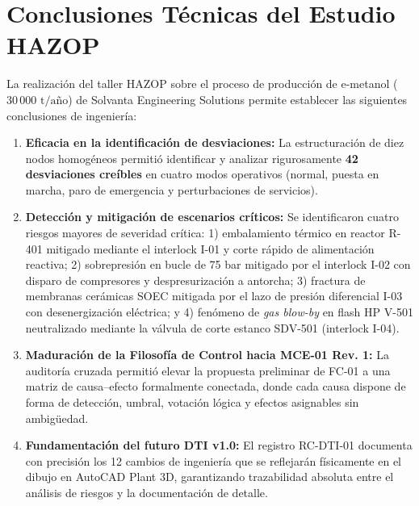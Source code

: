 \documentclass[10pt,letterpaper]{article}
\begin{document}
\section{Conclusiones Técnicas del Estudio HAZOP}
La realización del taller HAZOP sobre el proceso de producción de e-metanol ($30\,000\text{ t/año}$) de Solvanta Engineering Solutions permite establecer las siguientes conclusiones de ingeniería:
\begin{enumerate}[leftmargin=*]
    \item \textbf{Eficacia en la identificación de desviaciones:} La estructuración de diez nodos homogéneos permitió identificar y analizar rigurosamente \textbf{42 desviaciones creíbles} en cuatro modos operativos (normal, puesta en marcha, paro de emergencia y perturbaciones de servicios).
    \item \textbf{Detección y mitigación de escenarios críticos:} Se identificaron cuatro riesgos mayores de severidad crítica: 1) embalamiento térmico en reactor R-401 mitigado mediante el interlock I-01 y corte rápido de alimentación reactiva; 2) sobrepresión en bucle de 75 bar mitigado por el interlock I-02 con disparo de compresores y despresurización a antorcha; 3) fractura de membranas cerámicas SOEC mitigada por el lazo de presión diferencial I-03 con desenergización eléctrica; y 4) fenómeno de \textit{gas blow-by} en flash HP V-501 neutralizado mediante la válvula de corte estanco SDV-501 (interlock I-04).
    \item \textbf{Maduración de la Filosofía de Control hacia MCE-01 Rev. 1:} La auditoría cruzada permitió elevar la propuesta preliminar de FC-01 a una matriz de causa--efecto formalmente conectada, donde cada causa dispone de forma de detección, umbral, votación lógica y efectos asignables sin ambigüedad.
    \item \textbf{Fundamentación del futuro DTI v1.0:} El registro RC-DTI-01 documenta con precisión los 12 cambios de ingeniería que se reflejarán físicamente en el dibujo en AutoCAD Plant 3D, garantizando trazabilidad absoluta entre el análisis de riesgos y la documentación de detalle.
\end{enumerate}
\end{document}
